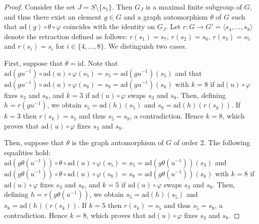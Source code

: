 \documentclass[a4paper, 11pt]{amsart}
\theoremstyle{definition}
\theoremstyle{remark}
\begin{document}
\begin{proof}

\smallskip \noindent Consider the set $J=S\setminus \lbrace s_1\rbrace$. Then $G_J$ is a maximal finite subgroup of $G$, and thus there exist an element $g\in G$ and a graph automorphism $\theta$ of $G$ such that $\mathrm{ad}(g)\circ \theta\circ \varphi$ coincides with the identity on $G_J$.  Let $r:G\rightarrow G'=\langle s_4,\ldots,s_8\rangle$ denote the retraction defined as follows: $r(s_1)=s_7$, $r(s_2)=s_6$, $r(s_3)=s_5$ and $r(s_i)=s_i$ for $i\in \lbrace 4,\ldots,8\rbrace$. We distinguish two cases. 

\smallskip \noindent First, suppose that $\theta=\mathrm{id}$. Note that $\mathrm{ad}(gu^{-1})\circ \mathrm{ad}(u)\circ  \varphi (s_5)=s_5=\mathrm{ad}(gu^{-1})(s_5)$ and that $\mathrm{ad}(gu^{-1})\circ \mathrm{ad}(u)\circ  \varphi (s_8)=s_8=\mathrm{ad}(gu^{-1})(s_k)$ with $k=8$ if $\mathrm{ad}(u)\circ \varphi$ fixes $s_3$ and $s_8$, and $k=3$ if $\mathrm{ad}(u)\circ \varphi$ swaps $s_3$ and $s_8$. Then, defining $h=r(gu^{-1})$, we obtain $s_5=\mathrm{ad}(h)(s_5)$ and $s_8=\mathrm{ad}(h)(r(s_k))$. If $k=3$ then $r(s_k)=s_5$ and thus $s_5=s_8$, a contradiction. Hence $k=8$, which proves that $\mathrm{ad}(u)\circ \varphi$ fixes $s_3$ and $s_8$.


\smallskip \noindent Then, suppose that $\theta$ is the graph automorphism of $G$ of order 2. The following equalities hold: $\mathrm{ad}(g\theta(u^{-1}))\circ \theta\circ  \mathrm{ad}(u)\circ  \varphi (s_5)=s_5=\mathrm{ad}(g\theta(u^{-1}))(s_3)$ and $\mathrm{ad}(g\theta(u^{-1}))\circ \theta \circ \mathrm{ad}(u)\circ  \varphi (s_8)=s_8=\mathrm{ad}(g\theta(u^{-1}))(s_k)$ with $k=8$ if $\mathrm{ad}(u)\circ \varphi$ fixes $s_3$ and $s_8$, and $k=5$ if $\mathrm{ad}(u)\circ \varphi$ swaps $s_3$ and $s_8$. Then, defining $h=r(g\theta(u^{-1}))$, we obtain $s_5=\mathrm{ad}(h)(s_5)$ and $s_8=\mathrm{ad}(h)(r(s_k))$. If $k=5$ then $r(s_k)=s_5$ and thus $s_5=s_8$, a contradiction. Hence $k=8$, which proves that $\mathrm{ad}(u)\circ \varphi$ fixes $s_3$ and $s_8$.


\end{proof}
\end{document}
